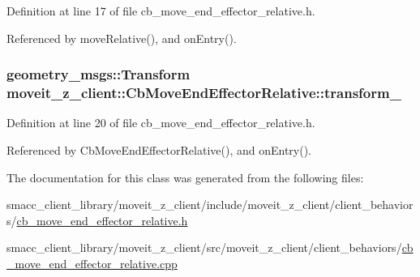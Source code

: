 Definition at line 17 of file cb\+\_\+move\+\_\+end\+\_\+effector\+\_\+relative.\+h.



Referenced by move\+Relative(), and on\+Entry().

\subsubsection[{\texorpdfstring{transform\+\_\+}{transform_}}]{\setlength{\rightskip}{0pt plus 5cm}geometry\+\_\+msgs\+::\+Transform moveit\+\_\+z\+\_\+client\+::\+Cb\+Move\+End\+Effector\+Relative\+::transform\+\_\+}\hypertarget{classmoveit__z__client_1_1CbMoveEndEffectorRelative_a0686340d0328df4d0ecb962b61026f43}{}\label{classmoveit__z__client_1_1CbMoveEndEffectorRelative_a0686340d0328df4d0ecb962b61026f43}


Definition at line 20 of file cb\+\_\+move\+\_\+end\+\_\+effector\+\_\+relative.\+h.



Referenced by Cb\+Move\+End\+Effector\+Relative(), and on\+Entry().



The documentation for this class was generated from the following files\+:\begin{DoxyCompactItemize}
\item 
smacc\+\_\+client\+\_\+library/moveit\+\_\+z\+\_\+client/include/moveit\+\_\+z\+\_\+client/client\+\_\+behaviors/\hyperlink{cb__move__end__effector__relative_8h}{cb\+\_\+move\+\_\+end\+\_\+effector\+\_\+relative.\+h}\item 
smacc\+\_\+client\+\_\+library/moveit\+\_\+z\+\_\+client/src/moveit\+\_\+z\+\_\+client/client\+\_\+behaviors/\hyperlink{cb__move__end__effector__relative_8cpp}{cb\+\_\+move\+\_\+end\+\_\+effector\+\_\+relative.\+cpp}\end{DoxyCompactItemize}
